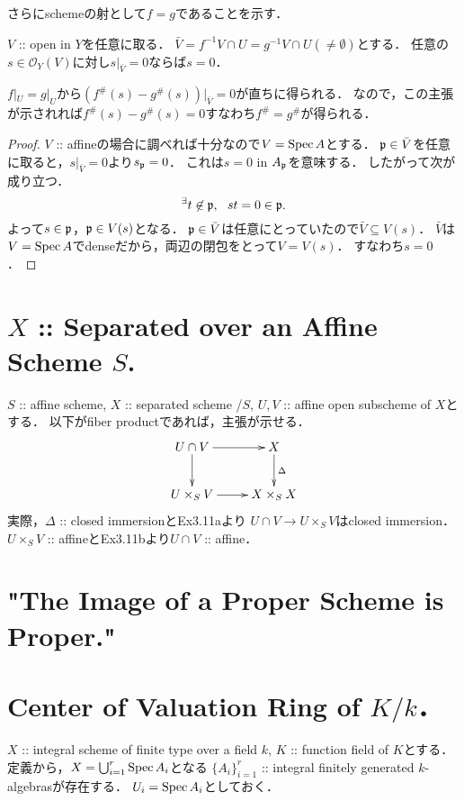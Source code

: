 \documentclass[a4paper]{jsarticle}
\newcommand{\shO}{\mathcal{O}}
\begin{document}
    さらにschemeの射として$f=g$であることを示す．
    \begin{Claim}
        $V$ :: open in $Y$を任意に取る．
        $\bar{V}=f^{-1}V \cap U=g^{-1}V \cap U(\neq \emptyset)$とする．
        任意の$s \in \shO_Y(V)$に対し$s|_{\bar{V}}=0$ならば$s=0$．
    \end{Claim}
    $f|_U=g|_U$から$(f^{\#}(s)-g^{\#}(s))|_{\bar{V}}=0$が直ちに得られる．
    なので，この主張が示されれば$f^{\#}(s)-g^{\#}(s)=0$すなわち$f^{\#}=g^{\#}$が得られる．
    \begin{proof}
        $V$ :: affineの場合に調べれば十分なので$V=\operatorname{Spec} A$とする．
        $\mathfrak{p} \in \bar{V}$を任意に取ると，$s|_{\bar{V}}=0$より$s_{\mathfrak{p}}=0$．
        これは$s=0$ in $A_{\mathfrak{p}}$を意味する．
        したがって次が成り立つ．
        \[ {}^{\exists} t \not \in \mathfrak{p},~~ st=0 \in \mathfrak{p}. \]
        よって$s \in \mathfrak{p}$，$\mathfrak{p} \in V(s)$となる．
        $\mathfrak{p} \in \bar{V}$は任意にとっていたので$\bar{V} \subseteq V(s)$．
        $\bar{V}$は$V=\operatorname{Spec} A$でdenseだから，両辺の閉包をとって$V=V(s)$．
        すなわち$s=0$．
    \end{proof}

\section{$X$ :: Separated over an Affine Scheme $S$.} %
    $S$ :: affine scheme, $X$ :: separated scheme /$S$,
    $U, V$ :: affine open subscheme of $X$とする．
    以下がfiber productであれば，主張が示せる．
    \[
    \xymatrix
    {
        U \cap V \ar[d]\ar[r]& X \ar[d]^-{\Delta} \\
    U \times_S V \ar[r]& X \times_S X
    }
    \]
    実際，$\Delta$ :: closed immersionとEx3.11aより
    $U \cap V \to U \times_S V$はclosed immersion．
    $U \times_S V$ :: affineとEx3.11bより$U \cap V$ :: affine．

\section{"The Image of a Proper Scheme is Proper."} %

\section{Center of Valuation Ring of $K/k$．} %
    $X$ :: integral scheme of finite type over a field $k$,
    $K$ :: function field of $K$とする．
    定義から，$X=\bigcup_{i=1}^r \operatorname{Spec} A_i$となる
    $\{A_i\}_{i=1}^r$ :: integral finitely generated $k$-algebrasが存在する．
    $U_i=\operatorname{Spec} A_i$としておく．
\end{document}
